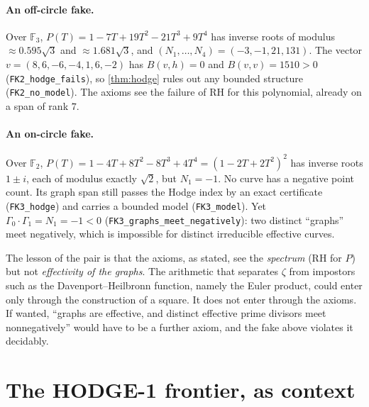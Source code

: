 \documentclass[11pt]{article}
\theoremstyle{definition}
\newcommand{\lean}[1]{\texttt{#1}}
\newcommand{\F}{\mathbb{F}}
\begin{document}
\paragraph{An off-circle fake.} Over $\F_3$, $P(T) = 1 - 7T + 19T^2 - 21T^3 + 9T^4$ has inverse roots of modulus $\approx 0.595\sqrt3$ and $\approx 1.681\sqrt3$, and $(N_1,\dots,N_4) = (-3,-1,21,131)$. The vector $v = (8,6,-6,-4,1,6,-2)$ has $B(v,h) = 0$ and $B(v,v) = 1510 > 0$ (\lean{FK2\_hodge\_fails}), so \cref{thm:hodge} rules out any bounded structure (\lean{FK2\_no\_model}). The axioms see the failure of RH for this polynomial, already on a span of rank $7$.

\paragraph{An on-circle fake.} Over $\F_2$, $P(T) = 1 - 4T + 8T^2 - 8T^3 + 4T^4 = (1-2T+2T^2)^2$ has inverse roots $1\pm i$, each of modulus exactly $\sqrt2$, but $N_1 = -1$. No curve has a negative point count. Its graph span still passes the Hodge index by an exact certificate (\lean{FK3\_hodge}) and carries a bounded model (\lean{FK3\_model}). Yet $\Gamma_0\cdot\Gamma_1 = N_1 = -1 < 0$ (\lean{FK3\_graphs\_meet\_negatively}): two distinct ``graphs'' meet negatively, which is impossible for distinct irreducible effective curves.

\medskip
The lesson of the pair is that the axioms, as stated, see the \emph{spectrum} (RH for $P$) but not \emph{effectivity of the graphs}. The arithmetic that separates $\zeta$ from impostors such as the Davenport--Heilbronn function, namely the Euler product, could enter only through the construction of a square. It does not enter through the axioms. If wanted, ``graphs are effective, and distinct effective prime divisors meet nonnegatively'' would have to be a further axiom, and the fake above violates it decidably.

\section{The HODGE-1 frontier, as context}\label{sec:hodge1}
\end{document}
